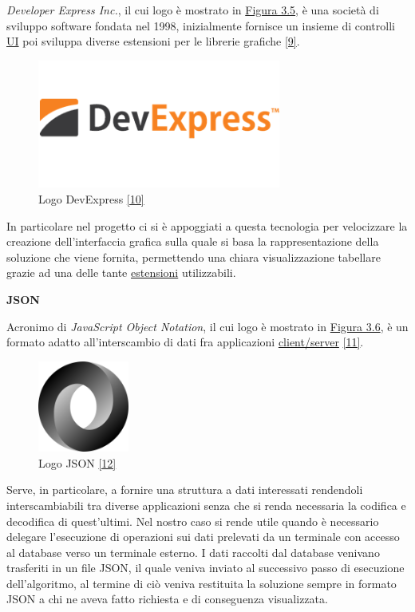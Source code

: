 \textit{Developer Express Inc.}, il cui logo è mostrato in \hyperref[dev-exp]{Figura 3.5}, è una società di sviluppo software fondata nel 1998, inizialmente fornisce un insieme di controlli 
\hyperref[UI]{UI\glo} poi sviluppa diverse estensioni per le librerie grafiche \hyperref[devexpress]{[9]}.

\begin{figure}[H]
	\includegraphics[width=8cm]{immagini/devexpress.png}
	\centering
	\caption{Logo DevExpress \hyperref[devlogo]{[10]}}
	\label{dev-exp}
\end{figure}

In particolare nel progetto ci si è appoggiati a questa tecnologia per velocizzare la creazione dell'interfaccia grafica sulla quale si basa la rappresentazione della soluzione
che viene fornita, permettendo una chiara visualizzazione tabellare grazie ad una delle tante \hyperref[Estensioni]{estensioni\glo} utilizzabili. 

\newpage

\textbf{JSON}

Acronimo di \textit{JavaScript Object Notation}, il cui logo è mostrato in \hyperref[js]{Figura 3.6}, è un formato adatto
all'interscambio di dati fra applicazioni \hyperref[Client/Server]{client/server\glo} \hyperref[json]{[11]}.

\begin{figure}[H]
	\includegraphics[width=3cm]{immagini/json.png}
	\centering
	\caption{Logo JSON \hyperref[jlogo]{[12]}}
	\label{js}
\end{figure}

Serve, in particolare, a fornire una struttura a dati interessati rendendoli interscambiabili tra diverse applicazioni senza che si renda necessaria la codifica e decodifica di quest'ultimi.
Nel nostro caso si rende utile quando è necessario delegare l'esecuzione di operazioni sui dati prelevati da un terminale con accesso al database verso un terminale esterno.
I dati raccolti dal database venivano trasferiti in un file JSON, il quale veniva inviato al successivo passo di esecuzione dell'algoritmo, al termine di ciò veniva restituita
la soluzione sempre in formato JSON a chi ne aveva fatto richiesta e di conseguenza visualizzata.\\

